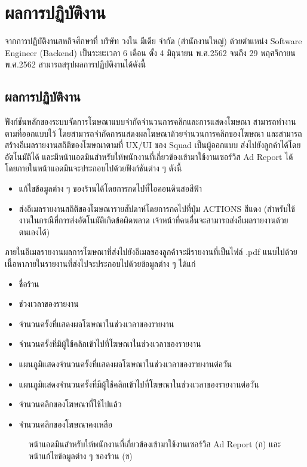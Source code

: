 \chapter{ผลการปฏิบัติงาน}
\label{chapter:result}
จากการปฏิบัติงานสหกิจศึกษาที่ บริษัท วงใน มีเดีย จำกัด (สำนักงานใหญ่) ด้วยตำแหน่ง Software Engineer (Backend) เป็นระยะเวลา 6 เดือน ตั้ง 4 มิถุนายน พ.ศ.2562 จนถึง 29 พฤศจิกายน พ.ศ.2562 สามารถสรุปผลการปฏิบัติงานได้ดังนี้
	
\section{ผลการปฏิบัติงาน}
ฟังก์ชันหลักของระบบจัดการโฆษณาแบบจำกัดจำนวนการคลิกและการแสดงโฆษณา สามารถทำงานตามที่ออกแบบไว้ โดยสามารถจำกัดการแสดงผลโฆษณาด้วยจำนวนการคลิกของโฆษณา และสามารถสร้างอีเมลรายงานสถิติของโฆษณาตามที่ UX/UI ของ Squad เป็นผู้ออกแบบ ส่งไปยังลูกค้าได้โดยอัตโนมัติได้ และมีหน้าแอดมินสำหรับให้พนักงานที่เกี่ยวข้องเข้ามาใช้งานเซอร์วิส Ad Report ได้ โดยภายในหน้าแอดมินจะประกอบไปด้วยฟังก์ชันต่าง ๆ ดังนี้

\begin{itemize}
	\item แก้ไขข้อมูลต่าง ๆ ของร้านได้โดยการกดไปที่ไอคอนดินสอสีฟ้า
	\item ส่งอีเมลรายงานสถิติของโฆษณารายสัปดาห์โดยการกดไปที่ปุ่ม ACTIONS สีแดง (สำหรับใช้งานในกรณีที่การส่งอัตโนมัติเกิดข้อผิดพลาด เจ้าหน้าที่คนอื่นจะสามารถส่งอีเมลรายงานด้วยตนเองได้) 
\end{itemize}

ภายในอีเมลรายงานผลการโฆษณาที่ส่งไปยังอีเมลของลูกค้าจะมีรายงานที่เป็นไฟล์ .pdf แนบไปด้วย เนื้อหาภายในรายงานที่ส่งไปจะประกอบไปด้วยข้อมูลต่าง ๆ ได้แก่

\begin{itemize}
	\item ชื่อร้าน
	\item ช่วงเวลาของรายงาน
	\item จำนวนครั้งที่แสดงผลโฆษณาในช่วงเวลาของรายงาน
	\item จำนวนครั้งที่มีผู้ใช้คลิกเข้าไปที่โฆษณาในช่วงเวลาของรายงาน
	\item แผนภูมิแสดงจำนวนครั้งที่แสดงผลโฆษณาในช่วงเวลาของรายงานต่อวัน
	\item แผนภูมิแสดงจำนวนครั้งที่มีผู้ใช้คลิกเข้าไปที่โฆษณาในช่วงเวลาของรายงานต่อวัน
	\item จำนวนคลิกของโฆษณาที่ใช้ไปแล้ว
	\item จำนวนคลิกของโฆษณาคงเหลือ
\end{itemize}

\begin{figure}[!h]
	\centering
	\caption{หน้าแอดมินสำหรับให้พนักงานที่เกี่ยวข้องเข้ามาใช้งานเซอร์วิส Ad Report (ก) และหน้าแก้ไขข้อมูลต่าง ๆ ของร้าน (ข)}
	\label{Fig:adminui}
\end{figure}

